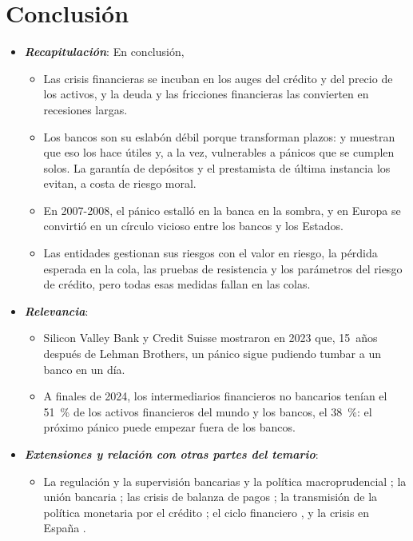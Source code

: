 \documentclass[11pt]{article}
\begin{document}
\section*{Conclusión}

\begin{itemize}
\item \textbf{\emph{Recapitulación}}: En conclusión,
  \begin{itemize}
  \item Las crisis financieras se incuban en los auges del crédito y del precio de los activos, y la deuda y las fricciones financieras las convierten en recesiones largas.
  \item Los bancos son su eslabón débil porque transforman plazos:  y  muestran que eso los hace útiles y, a la vez, vulnerables a pánicos que se cumplen solos. La garantía de depósitos y el prestamista de última instancia los evitan, a costa de riesgo moral.
  \item En 2007-2008, el pánico estalló en la banca en la sombra, y en Europa se convirtió en un círculo vicioso entre los bancos y los Estados.
  \item Las entidades gestionan sus riesgos con el valor en riesgo, la pérdida esperada en la cola, las pruebas de resistencia y los parámetros del riesgo de crédito, pero todas esas medidas fallan en las colas.
  \end{itemize}
\item \textbf{\emph{Relevancia}}:
  \begin{itemize}
  \item Silicon Valley Bank y Credit Suisse mostraron en 2023 que, 15~años después de Lehman Brothers, un pánico sigue pudiendo tumbar a un banco en un día.
  \item A finales de 2024, los intermediarios financieros no bancarios tenían el 51~\% de los activos financieros del mundo y los bancos, el 38~\%\nocite{FSB2025NBFI}: el próximo pánico puede empezar fuera de los bancos.
  \end{itemize}
\item \textbf{\emph{Extensiones y relación con otras partes del temario}}:
  \begin{itemize}
  \item La regulación y la supervisión bancarias y la política macroprudencial ; la unión bancaria ; las crisis de balanza de pagos ; la transmisión de la política monetaria por el crédito ; el ciclo financiero , y la crisis en España  .

\end{itemize}
\end{itemize}
\end{document}
